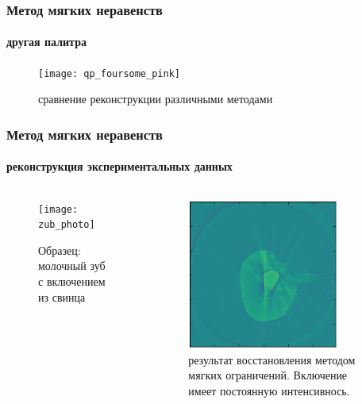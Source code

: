 \begin{frame}
\frametitle{Метод мягких неравенств}
\framesubtitle{другая палитра}

\begin{figure}
  \centering
  \vspace{-0.3cm}
  \texttt{[image: qp\_foursome\_pink]}
  \caption{сравнение реконструкции различными методами}
  \label{fig:sample}
\end{figure}

\end{frame}

\begin{frame}
\frametitle{Метод мягких неравенств}
\framesubtitle{реконструкция экспериментальных данных}

\centering
\vspace{-0.3cm}
\begin{columns}

\begin{column}{0.53\textwidth}
\begin{figure}
    \texttt{[image: zub\_photo]}
    \caption{Образец: молочный зуб с включением из свинца}
\end{figure}
\end{column}

\begin{column}{0.53\textwidth}
\begin{figure}
    \includegraphics[width=0.8\textwidth]{../Dissertation/images/part2_img/soft_ineq_pb_tooth}
    \caption{результат восстановления методом мягких ограничений. Включение имеет постоянную интенсивнось.}
\end{figure}
\end{column}
\end{columns}

\end{frame}

